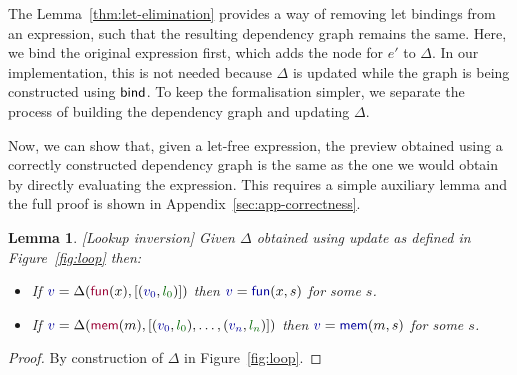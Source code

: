 \documentclass[sigplan,10pt,review,anonymous]{acmart}\settopmatter{printfolios=true,printccs=false,printacmref=false}
\newcounter{thc}
\theoremstyle{plain}
\newtheorem{lem}[thc]{Lemma}
\theoremstyle{definition}
\newcommand{\ident}[1]{\textnormal{\sffamily #1}}
\newcommand{\bndclr}[1]{\textcolor{kvdclr}{#1}}
\newcommand{\blblclr}[1]{\textcolor{numclr}{#1}}
\newcommand{\bnd}[1]{\textnormal{\textcolor{kvdclr}{\sffamily #1}}}
\newcommand{\bknd}[1]{\textnormal{\textcolor{prepclr}{\sffamily #1}}}
\begin{document}
The Lemma~\ref{thm:let-elimination} provides a way of removing let bindings from an expression,
such that the resulting dependency graph remains the same. Here, we bind the original expression
first, which adds the node for $e'$ to $\Delta$. In our implementation, this is not needed
because $\Delta$ is updated while the graph is being constructed using $\ident{bind}$. 
To keep the formalisation simpler, we separate the process of building the dependency graph 
and updating $\Delta$. 

Now, we can show that, given a let-free expression, the preview obtained using a correctly
constructed dependency graph is the same as the one we would obtain by directly evaluating the
expression. This requires a simple auxiliary lemma and the full proof is shown in 
Appendix~\ref{sec:app-correctness}.

\begin{lem}
\label{thm:lemma-lookup}[Lookup inversion]
Given $\Delta$ obtained using \ident{update} as defined in Figure~\ref{fig:loop} then: 
\begin{itemize}
\raggedright
\item[--] If $\bndclr{v}=\Delta(\bknd{fun}(x),[(\bndclr{v_0}, \blblclr{l_0})])$
then $\bndclr{v}=\bnd{fun}(x, s)$ for some $s$. 
\item[--] If $\bndclr{v}=\Delta(\bknd{mem}(m),[(\bndclr{v_0}, \blblclr{l_0}), \ldots, (\bndclr{v_n}, \blblclr{l_n})])$
then $\bndclr{v}=\bnd{mem}(m, s)$ for some $s$. 
\end{itemize}
\end{lem}
\begin{proof}
By construction of $\Delta$ in Figure~\ref{fig:loop}.  
\end{proof}
\end{document}
